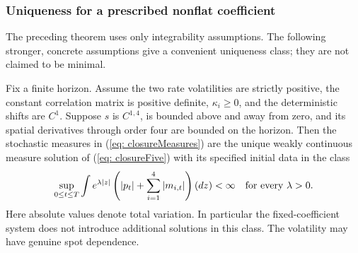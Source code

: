 \subsubsection{Uniqueness for a prescribed nonflat coefficient}
The preceding theorem uses only integrability assumptions. The following
stronger, concrete assumptions give a convenient uniqueness class; they are
not claimed to be minimal.

\begin{prop}\label{prop: closureIdentification}
Fix a finite horizon. Assume the two rate volatilities are strictly positive,
the constant correlation matrix is positive definite, $\kappa_i\geq0$, and
the deterministic shifts are $C^1$.
Suppose $s$ is $C^{1,4}$, is bounded above and away from zero, and its spatial
derivatives through order four are bounded on the horizon. Then the stochastic
measures in (\ref{eq: closureMeasures}) are the unique weakly continuous
measure solution of (\ref{eq: closureFive}) with its specified initial data in
the class
\begin{equation}\label{eq: closureWeightClass}
\sup_{0\leq t\leq T}\int e^{\lambda|z|}
       \left(|p_t|+\sum_{i=1}^4|m_{i,t}|\right)(dz)<\infty
\quad\hbox{for every }\lambda>0.
\end{equation}
Here absolute values denote total variation. In particular the fixed-coefficient
system does not introduce additional solutions in this class. The volatility
may have genuine spot dependence.
\end{prop}
